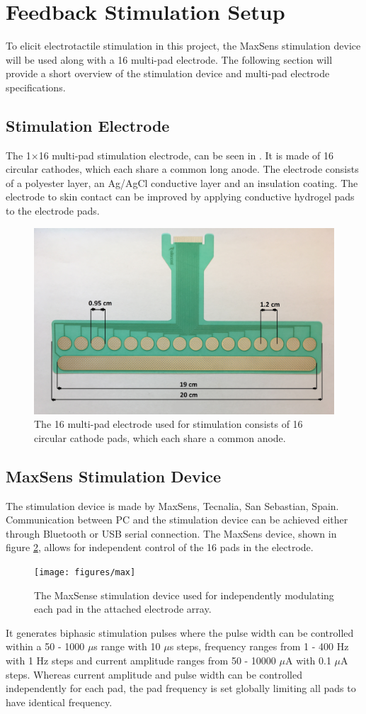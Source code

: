 \section{Feedback Stimulation Setup} \label{Maxxx}

To elicit electrotactile stimulation in this project, the MaxSens stimulation device will be used along with a 16 multi-pad electrode. The following section will provide a short overview of the stimulation device and multi-pad electrode specifications. 
 

\subsection{Stimulation Electrode}

The 1$\times$16 multi-pad stimulation electrode, can be seen in . It is made of 16 circular cathodes, which each share a common long anode. The electrode consists of a polyester layer, an Ag/AgCl conductive layer and an insulation coating. The electrode to skin contact can be improved by applying conductive hydrogel pads to the electrode pads. \cite{Strbac2016}     

\begin{figure}[H]                 
	\includegraphics[width=.57\textwidth]{figures/electrode}  
	\caption{The 16 multi-pad electrode used for stimulation consists of 16 circular cathode pads, which each share a common anode.}
	\label{fig:electrode} 
\end{figure}

\subsection{MaxSens Stimulation Device}

The stimulation device is made by MaxSens, Tecnalia, San Sebastian, Spain. Communication between PC and the stimulation device can be achieved either through Bluetooth or USB serial connection. The MaxSens device, shown in figure \ref{fig:max}, allows for independent control of the 16 pads in the electrode. 
\begin{figure}[H]                 
	\texttt{[image: figures/max]}  
	\caption{The MaxSense stimulation device used for independently modulating each pad in the attached electrode array.}
	\label{fig:max} 
\end{figure}   
It generates biphasic stimulation pulses where the pulse width can be controlled within a 50 - 1000 $\mu $s range with 10 $\mu $s steps, frequency ranges from 1 - 400 Hz with 1 Hz steps and current amplitude ranges from 50 - 10000 $\mu $A with 0.1 $\mu $A steps. Whereas current amplitude and pulse width can be controlled independently for each pad, the pad frequency is set globally limiting all pads to have identical frequency. 
